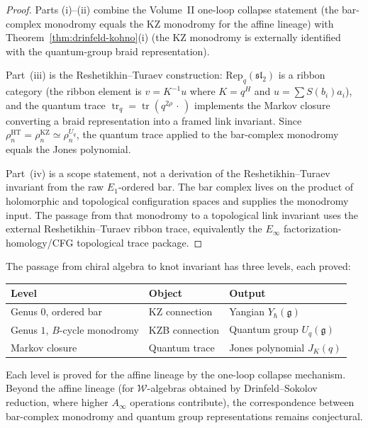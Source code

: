 \begin{proof}
Parts (i)--(ii) combine the Volume~II one-loop collapse statement
(the bar-complex monodromy equals the KZ monodromy for the affine
lineage) with Theorem~\ref{thm:drinfeld-kohno}(i) (the KZ monodromy
is externally identified with the quantum-group braid representation).

Part~(iii) is the Reshetikhin--Turaev construction: $\mathrm{Rep}_q(\mathfrak{sl}_2)$
is a ribbon category (the ribbon element is $v = K^{-1}u$ where
$K = q^H$ and $u = \sum S(b_i)a_i$), and the quantum trace
$\operatorname{tr}_q = \operatorname{tr}(q^{2\rho} \,\cdot\,)$
implements the Markov closure converting a braid representation into a
framed link invariant. Since $\rho_n^{\mathrm{HT}} = \rho_n^{\mathrm{KZ}}
\simeq \rho_n^{U_q}$, the quantum trace applied to the bar-complex
monodromy equals the Jones polynomial.

Part~(iv) is a scope statement, not a derivation of the
Reshetikhin--Turaev invariant from the raw $E_1$-ordered bar. The bar
complex lives on the product of holomorphic and topological
configuration spaces and supplies the monodromy input. The passage from
that monodromy to a topological link invariant uses the external
Reshetikhin--Turaev ribbon trace, equivalently the
$E_\infty$ factorization-homology/CFG topological trace package.
\end{proof}

\begin{remark}
\label{rem:three-levels}
The passage from chiral algebra to knot invariant has three levels,
each proved:
\begin{center}
\renewcommand{\arraystretch}{1.3}
\begin{tabular}{lll}
\textbf{Level} & \textbf{Object} & \textbf{Output} \\
\hline
Genus $0$, ordered bar & KZ connection & Yangian $Y_\hbar(\mathfrak{g})$ \\
Genus $1$, $B$-cycle monodromy & KZB connection & Quantum group $U_q(\mathfrak{g})$ \\
Markov closure & Quantum trace & Jones polynomial $J_K(q)$ \\
\end{tabular}
\end{center}
Each level is proved for the affine lineage by the one-loop collapse
mechanism. Beyond the affine lineage (for $\mathcal{W}$-algebras
obtained by Drinfeld--Sokolov reduction, where higher $A_\infty$
operations contribute), the correspondence between bar-complex
monodromy and quantum group representations remains conjectural.
\end{remark}

